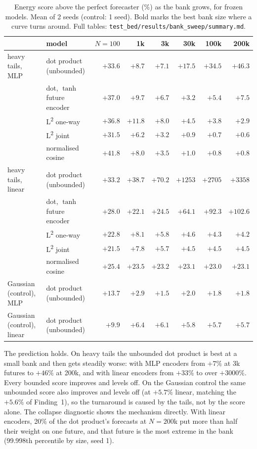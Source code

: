 \documentclass[11pt]{article}
\newcommand{\Ltwo}{L\textsuperscript{2}}
\theoremstyle{plain}
\theoremstyle{definition}
\theoremstyle{remark}
\begin{document}
\begin{table}[h]
\centering\small\setlength{\tabcolsep}{4pt}
\begin{tabular}{@{}llrrrrrr@{}}
\toprule
& model & $N=100$ & 1k & 3k & 30k & 100k & 200k \\
\midrule
heavy tails, MLP & dot product (unbounded) & $+33.6$ & $+8.7$ & $\mathbf{+7.1}$ & $+17.5$ & $+34.5$ & $+46.3$ \\
& dot, $\tanh$ future encoder & $+37.0$ & $+9.7$ & $+6.7$ & $\mathbf{+3.2}$ & $+5.4$ & $+7.5$ \\
& \Ltwo{} one-way & $+36.8$ & $+11.8$ & $+8.0$ & $+4.5$ & $+3.8$ & $+2.9$ \\
& \Ltwo{} joint & $+31.5$ & $+6.2$ & $+3.2$ & $+0.9$ & $+0.7$ & $+0.6$ \\
& normalised cosine & $+41.8$ & $+8.0$ & $+3.5$ & $+1.0$ & $+0.8$ & $+0.8$ \\
\midrule
heavy tails, linear & dot product (unbounded) & $\mathbf{+33.2}$ & $+38.7$ & $+70.2$ & $+1253$ & $+2705$ & $+3358$ \\
& dot, $\tanh$ future encoder & $+28.0$ & $\mathbf{+22.1}$ & $+24.5$ & $+64.1$ & $+92.3$ & $+102.6$ \\
& \Ltwo{} one-way & $+22.8$ & $+8.1$ & $+5.8$ & $+4.6$ & $+4.3$ & $+4.2$ \\
& \Ltwo{} joint & $+21.5$ & $+7.8$ & $+5.7$ & $+4.5$ & $+4.5$ & $+4.5$ \\
& normalised cosine & $+25.4$ & $+23.5$ & $+23.2$ & $+23.1$ & $+23.0$ & $+23.1$ \\
\midrule
Gaussian (control), MLP & dot product (unbounded) & $+13.7$ & $+2.9$ & $+1.5$ & $+2.0$ & $+1.8$ & $+1.8$ \\
Gaussian (control), linear & dot product (unbounded) & $+9.9$ & $+6.4$ & $+6.1$ & $+5.8$ & $+5.7$ & $+5.7$ \\
\bottomrule
\end{tabular}
\caption{Energy score above the perfect forecaster (\%) as the bank grows, for frozen
models. Mean of 2 seeds (control: 1 seed). Bold marks the best bank size where a curve turns
around. Full tables: \texttt{test\_bed/results/bank\_sweep/summary.md}.}
\label{tab:banksweep}
\end{table}

The prediction holds. On heavy tails the unbounded dot product is best at a small bank and
then gets steadily worse: with MLP encoders from $+7\%$ at 3k futures to $+46\%$ at 200k, and
with linear encoders from $+33\%$ to over $+3000\%$. Every bounded score improves and levels
off. On the Gaussian control the same unbounded score also improves and levels off (at
$+5.7\%$ linear, matching the $+5.6\%$ of Finding~1), so the turnaround is caused by the tails,
not by the score alone. The collapse diagnostic shows the mechanism directly. With linear
encoders, 20\% of the dot product's forecasts at $N=200$k put more than half their weight on
one future, and that future is the most extreme in the bank (99.998th percentile by size,
seed 1).
\end{document}
